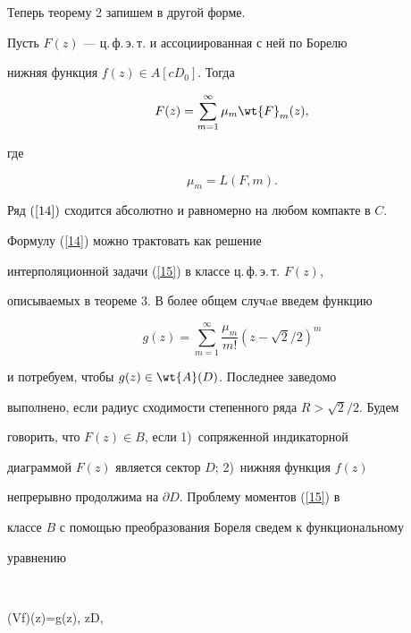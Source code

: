 Теперь теорему 2 запишем в другой форме.





\begin{thm}


Пусть $F(z)$ --- ц.\,ф.\,э.\,т. и ассоциированная с ней по Борелю


нижняя функция $f(z)\in A[cD_0]$. Тогда


\begin{equation}\label{14}


F(z)=\sum_{m=1}^\infty \mu_m \wt{F}_m(z),


\end{equation}


где


\begin{equation}\label{15}


\mu_m=L(F, m).


\end{equation}


Ряд $(\ref{14})$ сходится абсолютно и равномерно на любом компакте в $C$.


\end{thm}





Формулу (\ref{14}) можно трактовать как решение


интерполяционной задачи (\ref{15}) в классе ц.\,ф.\,э.\,т. $F(z)$,


описываемых в теореме 3. В более общем случaе введем функцию


$$


g(z)=\sum_{m=1}^\infty \frac{\mu_m}{m!}(z-\sqrt2/2)^m


$$


и потребуем, чтобы $g(z)\in \wt{A}(D)$. Последнее заведомо


выполнено, если радиус сходимости степенного ряда $R>\sqrt2/2$. Будем


говорить, что $F(z)\in B$, если 1)~сопряженной индикаторной


диаграммой $F(z)$ является сектор $D$; 2)~нижняя функция $f(z)$


непрерывно продолжима на $\partial D$. Проблему моментов (\ref{15}) в


классе $B$ с помощью преобразования Бореля сведем к функциональному


уравнению


$$


(Vf)(z)=g(z), \quad z\in D,


